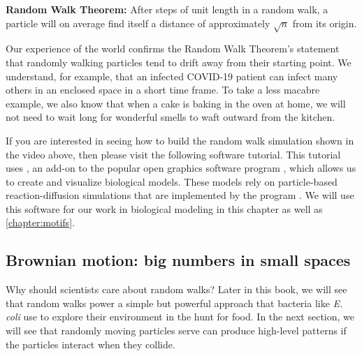 \textbf{Random Walk Theorem:} After  steps of unit length in a random walk, a particle will on average find itself a distance of approximately $\sqrt{n}$ from its origin.\\

\begin{note}\end{note}

Our experience of the world confirms the Random Walk Theorem's statement that randomly walking particles tend to drift away from their starting point. We understand, for example, that an infected COVID-19 patient can infect many others in an enclosed space in a short time frame. To take a less macabre example, we also know that when a cake is baking in the oven at home, we will not need to wait long for wonderful smells to waft outward from the kitchen.

If you are interested in seeing how to build the random walk simulation shown in the video above, then please visit the following software tutorial. This tutorial uses , an add-on to the popular open graphics software program  , which allows us to create and visualize biological models. These models rely on particle-based reaction-diffusion simulations that are implemented by the program  . We will use this software for our work in biological modeling in this chapter as well as \autoref{chapter:motifs}.

\begin{note}\end{note}


\FloatBarrier
{}
\subsection{Brownian motion: big numbers in small spaces}

Why should scientists care about random walks? Later in this book, we will see that random walks power a simple but powerful approach that bacteria like \textit{E. coli} use to explore their environment in the hunt for food. In the next section, we will see that randomly moving particles serve can produce high-level patterns if the particles interact when they collide.\\

